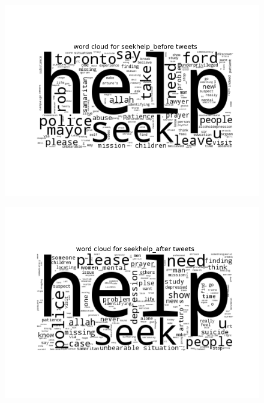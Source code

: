 \documentclass[11pt, oneside]{article}   	%
\begin{document}
 \begin{figure}
 \includegraphics[width=\textwidth]{../figures/seekhelp_before.png}
 \centering
 \end{figure}

 \begin{figure}
 \includegraphics[width=\textwidth]{../figures/seekhelp_after.png}
 \centering
 \end{figure}
\end{document}
